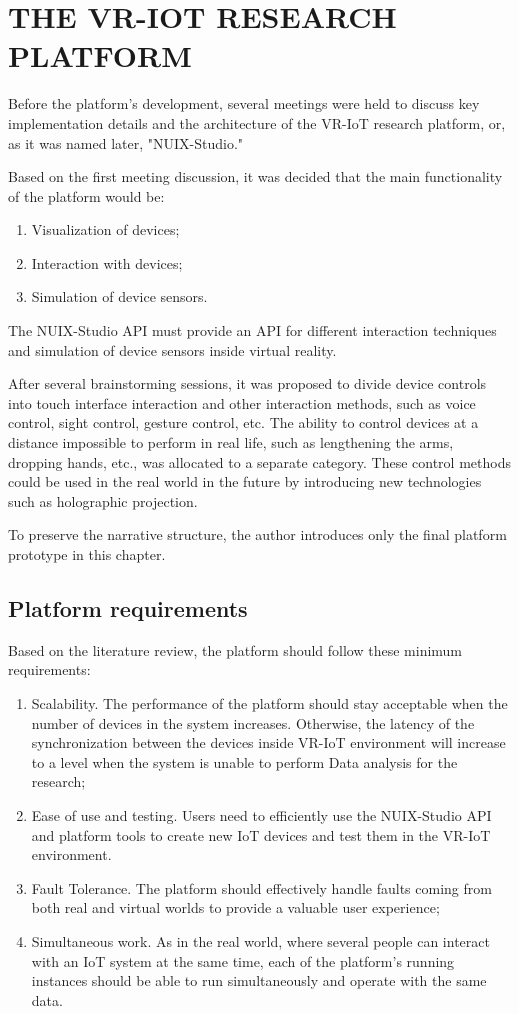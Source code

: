 
\chapter{THE VR-IOT RESEARCH PLATFORM}

Before the platform's development, several meetings were held to discuss key implementation details and the architecture of the VR-IoT research platform, or, as it was named later, "NUIX-Studio."

Based on the first meeting discussion, it was decided that the main functionality of the platform would be:
\begin{enumerate}
     \item Visualization of devices;
     \item Interaction with devices;
     \item Simulation of device sensors.
\end{enumerate}

The NUIX-Studio API must provide an API for different interaction techniques and simulation of device sensors inside virtual reality.

After several brainstorming sessions, it was proposed to divide device controls into touch interface interaction and other interaction methods, such as voice control, sight control, gesture control, etc. The ability to control devices at a distance impossible to perform in real life, such as lengthening the arms, dropping hands, etc., was allocated to a separate category. These control methods could be used in the real world in the future by introducing new technologies such as holographic projection.

To preserve the narrative structure, the author introduces only the final platform prototype in this chapter.

\section{Platform requirements}
Based on the literature review, the platform should follow these minimum requirements:
\begin{enumerate}
\item Scalability. The performance of the platform should stay acceptable when the number of devices in the system increases. Otherwise, the latency of the synchronization between the devices inside VR-IoT environment will increase to a level when the system is unable to perform Data analysis for the research;
\item Ease of use and testing. Users need to efficiently use the NUIX-Studio API and platform tools to create new IoT devices and test them in the VR-IoT environment.
\item Fault Tolerance. The platform should effectively handle faults coming from both real and virtual worlds to provide a valuable user experience;
\item Simultaneous work. As in the real world, where several people can interact with an IoT system at the same time, each of the platform's running instances should be able to run simultaneously and operate with the same data.
\end{enumerate}

